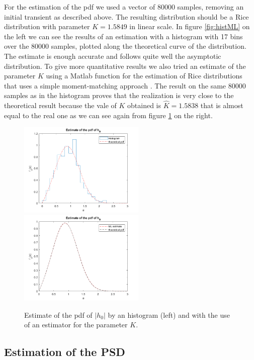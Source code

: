 \documentclass[a4paper,11.5pt]{article}
\begin{document}
For the estimation of the pdf we used a vector of 80000 samples, removing an initial transient as described above. The resulting distribution should be a Rice distribution with parameter $K=1.5849$ in linear scale. In figure \ref{fig:histML} on the left we can see the results of an estimation with a histogram with 17 bins over the 80000 samples, plotted along the theoretical curve of the distribution. The estimate is enough accurate and follows quite well the asymptotic distribution. To give more quantitative results we also tried an estimate of the parameter $K$ using a Matlab function for the estimation of Rice distributions that uses a simple moment-matching approach \cite{rice}. The result on the same 80000 samples as in the histogram proves that the realization is very close to the theoretical result because the vale of $K$ obtained is $\hat{K}=1.5838$ that is almost equal to the real one as we can see again from figure \ref{fig:histest} on the right.

\begin{figure}[ht]
	\begin{center}    
		\includegraphics[width=6cm]{figs/hist-pdf.png}
		\includegraphics[width=6cm]{figs/ML-est.png}
		\caption{Estimate of the pdf of $|h_0|$ by an histogram (left) and with the use of an estimator for the parameter $K$.}
		\label{fig:histest}
	\end{center}
\end{figure}

\subsection*{Estimation of the PSD}
\end{document}
